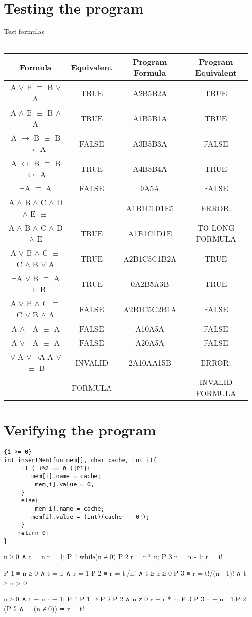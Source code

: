 \documentclass[11pt, a4paper, titlepage, block]{article}
\begin{document}
	\newpage
\section{Testing the program}
	Test formulas\\
	\\
	\begin{tabular}{|c|c|c|c|}
		\hline
			Formula & Equivalent & Program Formula & Program Equivalent \\
		\hline
			A $\vee $ B $\equiv $ B $\vee $ A & TRUE & A2B5B2A & TRUE\\
		\hline
			A $\wedge $ B $\equiv $ B $\wedge $ A & TRUE & A1B5B1A & TRUE\\
		\hline
			A $\rightarrow  $ B $\equiv $ B $\rightarrow $ A & FALSE & A3B5B3A & FALSE\\
		\hline
			A $\leftrightarrow   $ B $\equiv $ B $\leftrightarrow  $ A & TRUE & A4B5B4A & TRUE\\
		\hline
			$\neg $A $\equiv $ A & FALSE & 0A5A & FALSE\\
		\hline
			A $\wedge $ B $\wedge $  C $\wedge $ D $\wedge $  E $\equiv $ & & A1B1C1D1E5 & ERROR:\\ 

			A $\wedge $ B $\wedge $  C $\wedge $ D $\wedge $  E & TRUE & A1B1C1D1E & TO LONG FORMULA\\
		\hline
			A $\vee $ B $\wedge $ C $\equiv $ C $\wedge $ B $\vee $ A & TRUE & A2B1C5C1B2A & TRUE\\
		\hline
			$\neg $A $\vee $ B $\equiv $ A $\rightarrow  $ B& TRUE & 0A2B5A3B & TRUE\\
		\hline
			A $\vee $ B $\wedge $ C $\equiv $ C $\vee $ B $\wedge $ A & FALSE & A2B1C5C2B1A & FALSE\\
		\hline
			A $\wedge $ $\neg $A $\equiv $ A & FALSE & A10A5A & FALSE\\
		\hline
			A $\vee $ $\neg $A $\equiv $ A & FALSE & A20A5A & FALSE\\
		\hline
			$\vee $ A $\vee $ $\neg $A A $\vee $ $\equiv $ B & INVALID & 2A10AA15B & ERROR:\\
			& FORMULA &   & INVALID FORMULA\\
		\hline
	\end{tabular}

	\newpage
\section{Verifying the program}
\lstset{numbers=left, tabsize=2}
\begin{lstlisting}
{i >= 0}
int insertMem(fun mem[], char cache, int i){
     if ( i%2 == 0 ){P1}{
        mem[i].name = cache;
         mem[i].value = 0;
     }
     else{
         mem[i].name = cache;
        mem[i].value = (int)(cache - '0');
     }
    return 0;
}
\end{lstlisting}

{n ≥ 0 ∧ t = n}
r = 1; 
{P 1}
while(n ≠ 0) {P 2}{
	r = r * n;
	{P 3}
	n = n - 1;
}
{r = t!}

P 1 ≡  n ≥ 0 ∧ t = n ∧ r = 1
P 2 ≡  r = t!/n! ∧ t ≥ n ≥ 0
P 3 ≡  r = t!/(n - 1)! ∧ t ≥ n > 0

{n ≥ 0 ∧ t = n } r = 1;{ P 1 }
P 1 ⇒ P 2
{P 2 ∧ n ≠ 0 } r = r * n;{ P 3 }
{P 3} n = n - 1;{P 2}
(P 2 ∧ ¬ (n ≠ 0)) ⇒ r = t!
\end{document}

